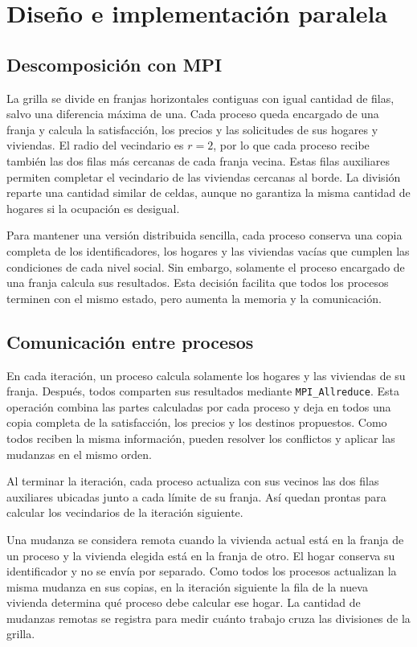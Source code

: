 \section{Diseño e implementación paralela}

\subsection{Descomposición con MPI}

La grilla se divide en franjas horizontales contiguas con igual cantidad de filas, salvo una diferencia máxima de una. Cada proceso queda encargado de una franja y calcula la satisfacción, los precios y las solicitudes de sus hogares y viviendas. El radio del vecindario es $r=2$, por lo que cada proceso recibe también las dos filas más cercanas de cada franja vecina. Estas filas auxiliares permiten completar el vecindario de las viviendas cercanas al borde. La división reparte una cantidad similar de celdas, aunque no garantiza la misma cantidad de hogares si la ocupación es desigual.

Para mantener una versión distribuida sencilla, cada proceso conserva una copia completa de los identificadores, los hogares y las viviendas vacías que cumplen las condiciones de cada nivel social. Sin embargo, solamente el proceso encargado de una franja calcula sus resultados. Esta decisión facilita que todos los procesos terminen con el mismo estado, pero aumenta la memoria y la comunicación.

\subsection{Comunicación entre procesos}

En cada iteración, un proceso calcula solamente los hogares y las viviendas de su franja. Después, todos comparten sus resultados mediante \texttt{MPI\_Allreduce}. Esta operación combina las partes calculadas por cada proceso y deja en todos una copia completa de la satisfacción, los precios y los destinos propuestos. Como todos reciben la misma información, pueden resolver los conflictos y aplicar las mudanzas en el mismo orden.

Al terminar la iteración, cada proceso actualiza con sus vecinos las dos filas auxiliares ubicadas junto a cada límite de su franja. Así quedan prontas para calcular los vecindarios de la iteración siguiente.

Una mudanza se considera remota cuando la vivienda actual está en la franja de un proceso y la vivienda elegida está en la franja de otro. El hogar conserva su identificador y no se envía por separado. Como todos los procesos actualizan la misma mudanza en sus copias, en la iteración siguiente la fila de la nueva vivienda determina qué proceso debe calcular ese hogar. La cantidad de mudanzas remotas se registra para medir cuánto trabajo cruza las divisiones de la grilla.

